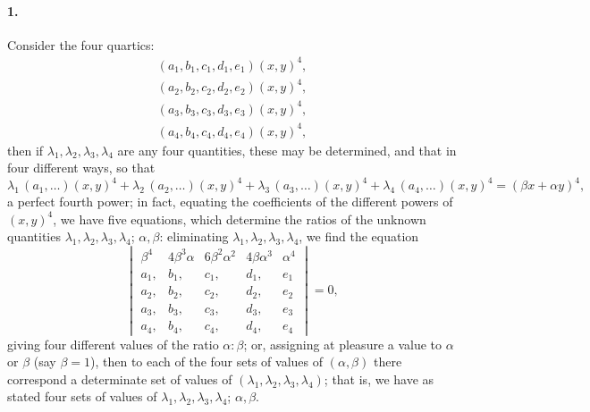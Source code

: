 \documentclass[11pt,a4paper]{article}
\begin{document}
\paragraph{1.}
Consider the four quartics:
\begin{align*}
(a_1, b_1, c_1, d_1, e_1)(x, y)^4, \\
(a_2, b_2, c_2, d_2, e_2)(x, y)^4, \\
(a_3, b_3, c_3, d_3, e_3)(x, y)^4, \\
(a_4, b_4, c_4, d_4, e_4)(x, y)^4,
\end{align*}
then if $\lambda_1, \lambda_2, \lambda_3, \lambda_4$ are any four quantities, these may be
determined, and that in four different ways, so that
\[
\lambda_1\,(a_1, \ldots)(x, y)^4 + \lambda_2\,(a_2, \ldots)(x, y)^4
 + \lambda_3\,(a_3, \ldots)(x, y)^4 + \lambda_4\,(a_4, \ldots)(x, y)^4
 = (\beta x + \alpha y)^4,
\]
a perfect fourth power; in fact, equating the coefficients of the different powers
of $(x, y)^4$, we have five equations, which determine the ratios of the unknown
quantities $\lambda_1, \lambda_2, \lambda_3, \lambda_4$; $\alpha, \beta$: eliminating
$\lambda_1, \lambda_2, \lambda_3, \lambda_4$, we find the equation
\[
\begin{vmatrix}
\beta^4 & 4\beta^3\alpha & 6\beta^2\alpha^2 & 4\beta\alpha^3 & \alpha^4 \\
a_1, & b_1, & c_1, & d_1, & e_1 \\
a_2, & b_2, & c_2, & d_2, & e_2 \\
a_3, & b_3, & c_3, & d_3, & e_3 \\
a_4, & b_4, & c_4, & d_4, & e_4
\end{vmatrix} = 0,
\]
giving four different values of the ratio $\alpha : \beta$; or, assigning at pleasure a
value to $\alpha$ or $\beta$ (say $\beta = 1$), then to each of the four sets of values of
$(\alpha, \beta)$ there correspond a determinate set of values of
$(\lambda_1, \lambda_2, \lambda_3, \lambda_4)$; that is, we have as stated four sets of values of
$\lambda_1, \lambda_2, \lambda_3, \lambda_4$; $\alpha, \beta$.
\end{document}

